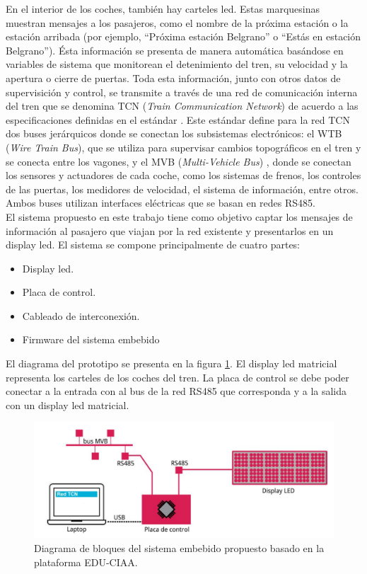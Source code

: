 En el interior de los coches, también hay carteles led. Estas marquesinas muestran mensajes a los pasajeros, como el nombre de la próxima estación o la estación arribada (por ejemplo, “Próxima estación Belgrano” o “Estás en estación Belgrano”). Ésta información se
presenta de manera automática basándose en variables de sistema que monitorean el detenimiento del tren, su velocidad y la apertura o cierre de puertas. Toda esta información, junto con otros datos de supervisición y control, se transmite a través de una red de comunicación interna del tren que se denomina TCN (\textit{Train Communication Network}) de acuerdo a las especificaciones definidas en el estándar \citep{IEC-61375-1}. Este estándar define para la red TCN dos buses jerárquicos donde se conectan los subsistemas electrónicos: el WTB (\textit{Wire Train Bus}), que se utiliza para supervisar cambios topográficos en el tren y se conecta entre los vagones, y el MVB (\textit{Multi-Vehicle Bus}) \citep{CSN EN 61375-2-1}\citep{IEC 61375-3-1:2012}, donde se conectan los sensores y actuadores de cada coche, como los sistemas de frenos, los controles de las puertas, los medidores de velocidad, el sistema de información, entre otros. Ambos buses utilizan interfaces eléctricas que se basan en redes RS485.\\


 El sistema propuesto en este trabajo tiene como objetivo captar los mensajes de información al pasajero que viajan por la red existente y presentarlos en un display led. El sistema se compone principalmente de cuatro partes:
 \begin{itemize}
\item Display led.
\item Placa de control.
\item Cableado de interconexión.
\item Firmware del sistema embebido
 \end{itemize}

El diagrama del prototipo se presenta en la figura \ref{fig:diagramaPIDSCIAA}. El display led matricial representa los carteles de los coches del tren. La placa de control se debe poder conectar a la entrada con al bus de la red RS485 que corresponda y a la salida con un display led matricial.

\begin{figure}[ht]
	\centering
	\includegraphics[width=1\textwidth]{./Figures/diagramaPIDSCIAA.png}
	\caption{Diagrama de bloques del sistema embebido propuesto basado en la plataforma EDU-CIAA.}
	\label{fig:diagramaPIDSCIAA}
\end{figure}


